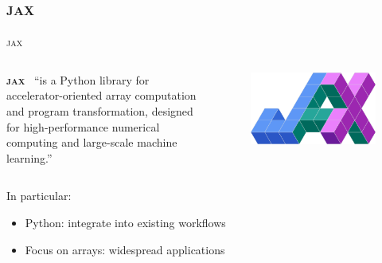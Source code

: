 \documentclass[usenames,dvipsnames,t]{beamer}
\newcommand{\ghlink}[1]{\href{https://github.com/#1}{\textcolor{black}{\faGithub}}}
\begin{document}
\subsection{\textsc{jax}}


\begin{frame}{\textsc{jax}}

  \def\x{5mm}
  \def\y{1mm}

  \begin{columns}
    \begin{column}{0.84\linewidth}
      \textbf{\textsc{jax}}~\ghlink{jax-ml/jax}
      ``is a Python library for accelerator-oriented array computation and program transformation, designed for high-performance numerical computing and large-scale machine learning.''~\cite{jax2018github}
    \end{column}
    \begin{column}{0.15\linewidth}
      \begin{figure}
        \centering
        \includegraphics[width=0.95\linewidth]{Figures/jax.png}
      \end{figure}
    \end{column}
  \end{columns}

  \vspace{\x}

  In particular:
  \begin{itemize}
    \vspace{\y}
    \item Python: integrate into existing workflows

    \vspace{\y}

    \item Focus on arrays: widespread applications
    
    \vspace{\y}


\end{itemize}
\end{frame}
\end{document}
